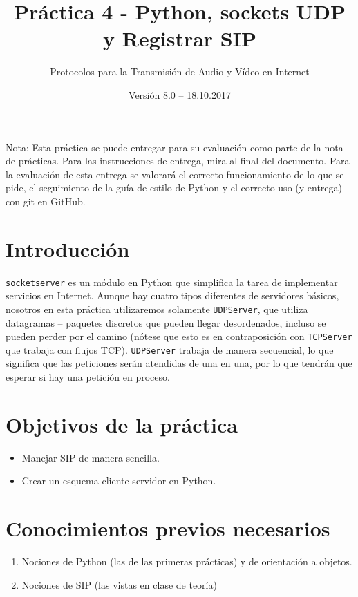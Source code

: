 \documentclass[11pt,a4paper]{article}
\begin{document}
\title{Práctica 4 - Python, sockets UDP y Registrar SIP}
\author{Protocolos para la Transmisión de Audio y Vídeo en Internet}
\date{Versión 8.0 – 18.10.2017}


\maketitle

Nota: Esta práctica se puede entregar para su evaluación como parte de la nota de prácticas. Para las instrucciones de entrega, mira al final del documento. Para la evaluación de esta entrega se valorará el correcto funcionamiento de lo que se pide, el seguimiento de la guía de estilo de Python y el correcto uso (y entrega) con git en GitHub.

\section{Introducción}

\texttt{socketserver} es un módulo en Python que simplifica la tarea de implementar servicios en Internet. Aunque hay cuatro tipos diferentes de servidores básicos, nosotros en esta práctica utilizaremos solamente \texttt{UDPServer}, que utiliza datagramas -- paquetes discretos que pueden llegar desordenados, incluso se pueden perder por el camino (nótese que esto es en contraposición con \texttt{TCPServer} que trabaja con flujos TCP). \texttt{UDPServer} trabaja de manera secuencial, lo que significa que las peticiones serán atendidas de una en una, por lo que tendrán que esperar si hay una petición en proceso.

\section{Objetivos de la práctica}

\begin{itemize}
  \item Manejar SIP de manera sencilla.
  \item Crear un esquema cliente-servidor en Python.
\end{itemize}

\section{Conocimientos previos necesarios}

\begin{enumerate}
  \item Nociones de Python (las de las primeras prácticas) y de orientación a objetos.
  \item Nociones de SIP (las vistas en clase de teoría)
\end{enumerate}
\end{document}
